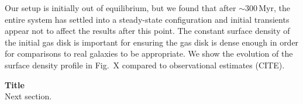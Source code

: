 \documentclass{natureprintstyle}
\begin{document}
Our setup is initially out of equilibrium, but we found that after
$\sim300\,\textrm{Myr}$, the entire system has settled into a steady-state
configuration and initial transients appear not to affect the results after
this point. The constant surface density of the initial gas disk is important
for ensuring the gas disk is dense enough in order for comparisons to real
galaxies to be appropriate. We show the evolution of the surface density
profile in Fig.~X compared to observational estimates (CITE).

\vspace{12pt}

\noindent
{\bf Title}
\\
\noindent
Next section.

% 
\end{document}
